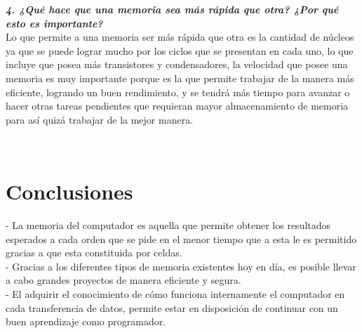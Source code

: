 \documentclass{article}
\begin{document}
\textbf {\textit{4. ¿Qué hace que una memoria sea más rápida que otra? ¿Por qué esto es importante?}}\\
Lo que permite a una memoria ser más rápida que otra es la cantidad de núcleos ya que se puede lograr mucho por los ciclos que se presentan en cada uno, lo que incluye que posea más transistores y condensadores, la velocidad que posee una memoria es muy importante porque es la que permite trabajar de la manera más eficiente, logrando un buen rendimiento, y se tendrá más tiempo para avanzar o hacer otras tareas pendientes que requieran mayor almacenamiento de memoria para así quizá trabajar de la mejor manera.

\begin{lstlisting}
    
\end{lstlisting}

\section{Conclusiones} \label{conclulsion}
- La memoria del computador es aquella que permite obtener los resultados esperados a cada orden que se pide en el menor tiempo que a esta le es permitido gracias a que esta constituida por celdas.\\

- Gracias a los diferentes tipos de memoria existentes hoy en día, es posible llevar a cabo grandes proyectos de manera eficiente y segura.\\

- El adquirir el conocimiento de cómo funciona internamente el computador en cada transferencia de datos, permite estar en disposición de continuar con un buen aprendizaje como programador.



\end{document}
